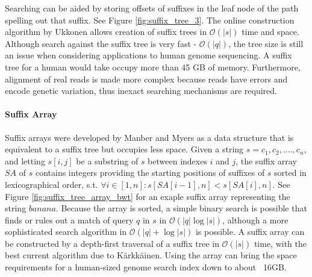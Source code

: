 Searching can be aided by storing offsets of suffixes in the leaf node of the path spelling out that suffix. See Figure \ref{fig:suffix_tree_3}. The online construction algorithm by Ukkonen\autocite{ukkonen1995line} allows creation of suffix trees in $\mathcal{O}(|s|)$ time and space. Although search against the suffix tree is very fast - $\mathcal{O}(|q|)$, the tree size is still an issue when considering applications to human genome sequencing. A suffix tree for a human would take occupy more than 45 GB of memory\autocite{langmead_teaching}. Furthermore, alignment of real reads is made more complex because reads have errors and encode genetic variation, thus inexact searching mechanisms are required.

\paragraph{Suffix Array}

Suffix arrays were developed by Manber and Myers\autocite{manber1993suffix} as a data structure that is equivalent to a suffix tree but occupies less space. Given a string $s = c_1,c_2,....,c_n$, and letting $s[i,j]$ be a substring of $s$ between indexes $i$ and $j$, the suffix array $SA$ of $s$ contains integers providing the starting positions of suffixes of $s$ sorted in lexicographical order, s.t. $\forall i \in [1,n]: s[SA[i-1],n] < s[SA[i],n]$. See Figure \ref{fig:suffix_tree_array_bwt} for an exaple suffix array representing the string $banana$. Because the array is sorted, a simple binary search is possible that finds or rules out a match of query $q$ in $s$ in $\mathcal{O}(|q|\log{|s|})$, although a more sophisticated search algorithm in $\mathcal{O}(|q| + \log{|s|})$ is possible\autocite{manber1993suffix}. A suffix array can be constructed by a depth-first traversal of a suffix tree in $\mathcal{O}(|s|)$ time, with the best current algorithm due to Kärkkäinen\autocite{karkkainen2003simple}. Using the array can bring the space requirements for a human-sized genome search index down to about ~16GB\autocite{langmead_teaching}.


